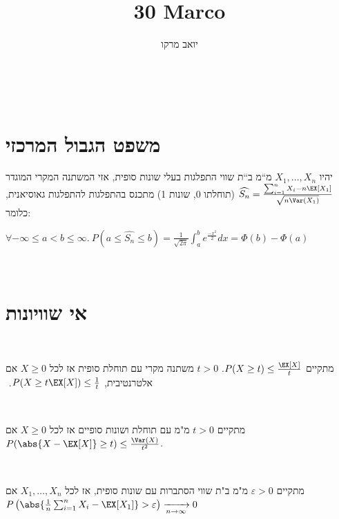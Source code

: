 \documentclass[8pt,twocolumn]{extarticle}
\title{30 Marco}
\author{יואב מרקו}
\begin{document}
‏\section{משפט הגבול המרכזי}
יהיו $X_{1},...,X_{n}$ מ“מ ב“ת שווי התפלגות בעלי שונות
סופית, אזי המשתנה המקרי המוגדר $\widehat{S_{n}}=\frac{\sum_{i=1}^{n}X_{i}-n\EX\left[X_{1}\right]}{\sqrt{n\Var\left(X_{1}\right)}}$
(תוחלתו 0, שונות 1) מתכנס בהתפלגות להתפלגות גאוסיאנית, כלומר:

\hspace*{\fill}
\(\displaystyle
\forall -\infty\leq a<b\leq\infty.\
P\left(a\leq\widehat{S_{n}}\leq b\right)=\frac{1}{\sqrt{2\pi}}\int_{a}^{b}e^{\frac{-x^{2}}{2}}dx=\varPhi\left(b\right)-\varPhi\left(a\right)\)

‏\section{אי שוויונות} ‏\begin{claim}[א"ש מרקוב]
  אם ‎\(X\geq 0\) משתנה מקרי עם תוחלת סופית אז לכל ‎\(t>0\) מתקיים \(P(X\geq t) \leq  \frac{\EX[X]}{t}\).
  אלטרנטיבית, \(P(X \geq t \EX[X]) \leq \frac{1}{t}\).
  ‏\end{claim}
‏\begin{claim}[א"ש צ'בישב] אם ‎\(X\geq 0\) מ"מ עם תוחלת ושונות סופיים
  אז לכל ‎\(t>0\) מתקיים ‎\( P(\abs{X - \EX[X]} \geq t) \leq \frac{\Var(X)}{t^2} \).
  ‏\end{claim}
‏\begin{theorem}
אם ‎\(X_1, \dots ,X_n\) מ"מ ב"ת שווי הסתברות עם שונות סופית, אז לכל ‎\(\varepsilon >0\) מתקיים
\hspace*{\fill}
‎\( P\left(\abs{\frac{1}{n} \sum_{i=1}^n X_i - \EX[X_1]} > \varepsilon\right)\xrightarrow[n\rightarrow\infty]{} 0 \)
\hspace*{\fill}
‏\end{theorem}
\end{document}
